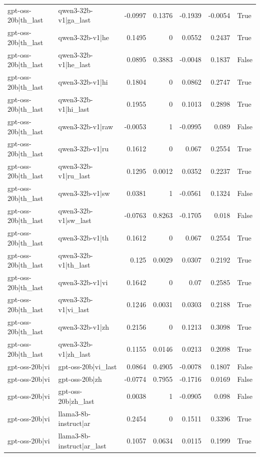 \begin{table}
\begin{tabular}{l l r r r r l}
gpt-oss-20b|th_last & qwen3-32b-v1|ga_last & -0.0997 & 0.1376 & -0.1939 & -0.0054 & True \\
gpt-oss-20b|th_last & qwen3-32b-v1|he & 0.1495 & 0 & 0.0552 & 0.2437 & True \\
gpt-oss-20b|th_last & qwen3-32b-v1|he_last & 0.0895 & 0.3883 & -0.0048 & 0.1837 & False \\
gpt-oss-20b|th_last & qwen3-32b-v1|hi & 0.1804 & 0 & 0.0862 & 0.2747 & True \\
gpt-oss-20b|th_last & qwen3-32b-v1|hi_last & 0.1955 & 0 & 0.1013 & 0.2898 & True \\
gpt-oss-20b|th_last & qwen3-32b-v1|raw & -0.0053 & 1 & -0.0995 & 0.089 & False \\
gpt-oss-20b|th_last & qwen3-32b-v1|ru & 0.1612 & 0 & 0.067 & 0.2554 & True \\
gpt-oss-20b|th_last & qwen3-32b-v1|ru_last & 0.1295 & 0.0012 & 0.0352 & 0.2237 & True \\
gpt-oss-20b|th_last & qwen3-32b-v1|sw & 0.0381 & 1 & -0.0561 & 0.1324 & False \\
gpt-oss-20b|th_last & qwen3-32b-v1|sw_last & -0.0763 & 0.8263 & -0.1705 & 0.018 & False \\
gpt-oss-20b|th_last & qwen3-32b-v1|th & 0.1612 & 0 & 0.067 & 0.2554 & True \\
gpt-oss-20b|th_last & qwen3-32b-v1|th_last & 0.125 & 0.0029 & 0.0307 & 0.2192 & True \\
gpt-oss-20b|th_last & qwen3-32b-v1|vi & 0.1642 & 0 & 0.07 & 0.2585 & True \\
gpt-oss-20b|th_last & qwen3-32b-v1|vi_last & 0.1246 & 0.0031 & 0.0303 & 0.2188 & True \\
gpt-oss-20b|th_last & qwen3-32b-v1|zh & 0.2156 & 0 & 0.1213 & 0.3098 & True \\
gpt-oss-20b|th_last & qwen3-32b-v1|zh_last & 0.1155 & 0.0146 & 0.0213 & 0.2098 & True \\
gpt-oss-20b|vi & gpt-oss-20b|vi_last & 0.0864 & 0.4905 & -0.0078 & 0.1807 & False \\
gpt-oss-20b|vi & gpt-oss-20b|zh & -0.0774 & 0.7955 & -0.1716 & 0.0169 & False \\
gpt-oss-20b|vi & gpt-oss-20b|zh_last & 0.0038 & 1 & -0.0905 & 0.098 & False \\
gpt-oss-20b|vi & llama3-8b-instruct|ar & 0.2454 & 0 & 0.1511 & 0.3396 & True \\
gpt-oss-20b|vi & llama3-8b-instruct|ar_last & 0.1057 & 0.0634 & 0.0115 & 0.1999 & True \\

\end{tabular}
\end{table}
